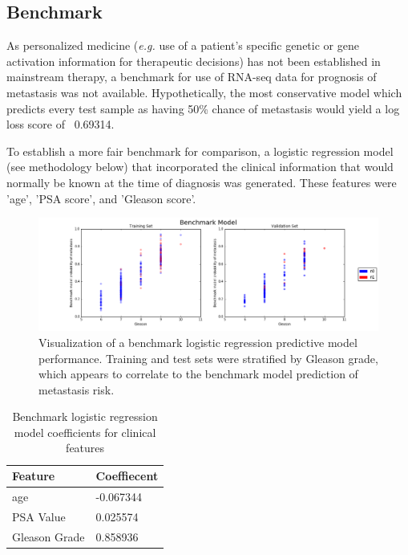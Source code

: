 \documentclass[final]{article}
\begin{document}
\subsection{Benchmark}

As personalized medicine (\textit{e.g.} use of a patient's specific genetic or gene
activation information for therapeutic decisions) has not been established in
mainstream therapy, a benchmark for use of RNA-seq data for prognosis of
metastasis was not available.  Hypothetically, the most conservative model which
predicts every test sample as having 50\% chance of metastasis would yield a log
loss score of ~0.69314.

To establish a more fair benchmark for comparison, a logistic regression model
(see methodology below) that incorporated the clinical information that would
normally be known at the time of diagnosis was generated.  These features were
'age', 'PSA score', and 'Gleason score'.

\begin{figure}[h]
  \centering
  \includegraphics[width=\textwidth]{benchmark}
  \caption{Visualization of a benchmark logistic regression predictive model performance.\label{fig:benchmark}
  Training and test sets were stratified by Gleason grade, which appears to correlate to the benchmark model
  prediction of metastasis risk.}
\end{figure}

\begin{table}
  \centering
  \caption{\label{tab:benchcoefs} Benchmark logistic regression model coefficients for clinical features}
    \begin{tabular}{l l}
      \hline
      Feature & Coeffiecent \\  \hline
      age & -0.067344 \\
      PSA Value & 0.025574 \\
      Gleason Grade & 0.858936 \\
      \hline
    \end{tabular}
  \end{table}
\end{document}

